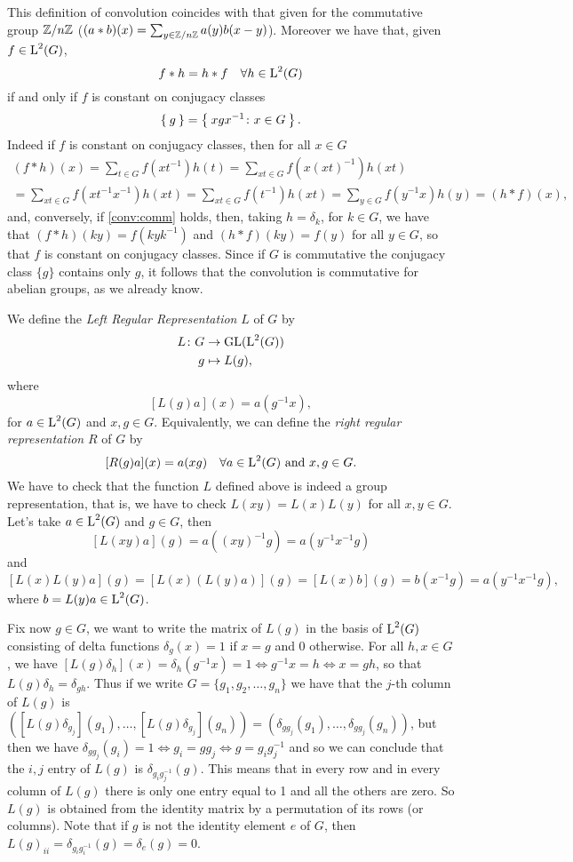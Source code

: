 \begin{rem}
This definition of convolution coincides with that given for the commutative group ${\mathbb Z}/{n{\mathbb Z}}$ ($(a\ast b)(x)=\sum_{y \in {\mathbb Z}/{n{\mathbb Z}}} a(y)b(x-y)$). 
Moreover we have that, given $f\in \operatorname{L}^2(G)$,
\begin{equation}
\label{conv:comm}
f*h=h*f \quad \forall h \in \operatorname{L}^2(G)
\end{equation}
if and only if $f$ is constant on conjugacy classes
\[
\Set{g}=\Set{xgx^{-1}\colon x\in G}.
\]
Indeed if $f$ is constant on conjugacy classes, then for all $x\in G$
\begin{multline*}
(f\ast h)(x) =\sum_{t \in G} f(xt^{-1})h(t)=\sum_{xt \in G} f(x(xt)^{-1})h(xt)\\
=\sum_{xt \in G} f(xt^{-1}x^{-1})h(xt)
=\sum_{xt \in G} f(t^{-1})h(xt)
=\sum_{y \in G} f(y^{-1}x)h(y)= (h*f)(x),
\end{multline*}
and, conversely, if \ref{conv:comm} holds, then, taking $h=\delta_k$, for $k\in G$, we have that $(f\ast h)(ky)=f(kyk^{-1})$ and $(h*f)(ky)=f(y)$ for all $y \in G$, so that $f$ is constant on conjugacy classes.
Since if $G$ is commutative the conjugacy class $\{g\}$ contains only $g$, it follows that the convolution is commutative for abelian groups, as we already know.
\end{rem}
\begin{exmp}
\label{exa:lrr}
We define the \emph{Left Regular Representation} $L$ of $G$ by 
\begin{align*}
L\colon G &\rightarrow \operatorname{GL}(\operatorname{L}^2(G))\\
	 g&\mapsto L(g),
\end{align*}
where 
\[
[L(g)a](x)=a(g^{-1}x),
\]
for $a \in \operatorname{L}^2(G)$ and $x,g \in G$.
Equivalently, we can define the \emph{right regular representation} $R$ of $G$ by
\[
[R(g)a](x)=a(xg)\quad \forall a \in \operatorname{L}^2(G)\text{ and $x,g\in G$}.
\] 
We have to check that the function $L$ defined above is indeed a group representation, that is, we have to check $L(xy)=L(x)L(y)$ for all $x,y \in G$. Let's take $a \in \operatorname{L}^2(G)$ and $g\in G$, then
\[ [L(xy)a](g)=a((xy)^{-1}g)=a(y^{-1}x^{-1}g)
\]
and
\[
[L(x) L(y)a](g)=[L(x)(L(y)a)](g)=[L(x)b](g)=b(x^{-1}g)=a(y^{-1}x^{-1}g),
\]
where $b=L(y)a \in \operatorname{L}^2(G)$.

Fix now $g\in G$, we want to write the matrix of $L(g)$ in the basis of $\operatorname{L}^2(G)$ consisting of delta functions $\delta_g(x)=1$ if $x=g$ and 0 otherwise. For all $h,x\in G$, we have $[L(g)\delta_h](x)=\delta_h(g^{-1}x)=1 \iff g^{-1}x=h \iff x=gh$, so that $L(g)\delta_h=\delta_{gh}$. Thus if we write $G=\{g_1,g_2,\dots , g_n\}$ we have that the $j$-th column of $L(g)$ is $([L(g)\delta_{g_j}](g_1),\dots , [L(g)\delta_{g_j}](g_n))=(\delta_{gg_j}(g_1),\dots ,\delta_{gg_j}(g_n))$, but then we have $\delta_{gg_j}(g_i)=1\iff g_i=gg_j\iff g=g_ig_j^{-1}$ and so we can conclude that the $i,j$ entry of $L(g)$ is $\delta_{g_ig_j^{-1}}(g)$. This means that in every row and in every column of $L(g)$ there is only one entry equal to 1 and all the others are zero. So $L(g)$ is obtained from the identity matrix by a permutation of its rows (or columns). Note that if $g$ is not the identity element $e$ of $G$, then $L(g)_{ii}=\delta_{g_ig_i^{-1}}(g)=\delta_{e}(g)=0$.
\end{exmp}

